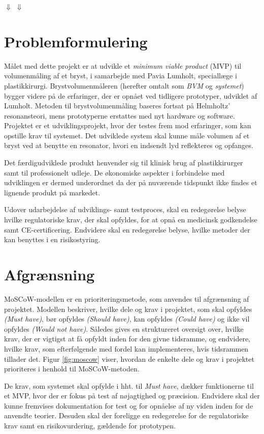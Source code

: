 \Wudl
$\Downarrow$
\Wudled
$\Downarrow$
\W
\vspace{5mm}  

\section{Problemformulering}
Målet med dette projekt er at udvikle et \textit{minimum viable product} (MVP) til volumenmåling af et bryst, i samarbejde med Pavia Lumholt, speciallæge i plastikkirurgi. Brystvolumenmåleren (herefter omtalt som \textit{BVM} og \textit{systemet}) bygger videre på de erfaringer, der er opnået ved tidligere prototyper, udviklet af Lumholt. Metoden til brystvolumenmåling baseres fortsat på Helmholtz' resonansteori, mens prototyperne erstattes med nyt hardware og software. Projektet er et udviklingsprojekt, hvor der testes frem mod erfaringer, som kan opstille krav til systemet. Det udviklede system skal kunne måle volumen af et bryst ved at benytte en resonator, hvori en indsendt lyd reflekteres og opfanges. 

Det færdigudviklede produkt henvender sig til klinisk brug af plastikkirurger samt til professionelt udleje. De økonomiske aspekter i forbindelse med udviklingen er dermed underordnet da der på nuværende tidspunkt ikke findes et lignende produkt på markedet.   

Udover udarbejdelse af udviklings- samt testproces, skal en redegørelse belyse hvilke regulatoriske krav, der skal opfyldes, for at opnå en medicinsk godkendelse samt CE-certificering. Endvidere skal en redegørelse belyse, hvilke metoder der kan benyttes i en risikostyring.

\section{Afgrænsning}
MoSCoW-modellen er en prioriteringsmetode, som anvendes til afgrænsning af projektet. Modellen beskriver, hvilke dele og krav i projektet, som skal opfyldes \textit{(Must have)}, bør opfyldes \textit{(Should have)}, kan opfyldes \textit{(Could have)} og ikke vil opfyldes \textit{(Would not have)}. Således gives en struktureret oversigt over, hvilke krav, der er vigtigst at få opfyldt inden for den givne tidsramme, og endvidere, hvilke krav, som efterfølgende med fordel kan implementeres, hvis tidsrammen tillader det. Figur \ref{fig:moscow} viser, hvordan de enkelte dele og krav i projektet prioriteres i henhold til MoSCoW-metoden.

De krav, som systemet skal opfylde i hht. til \textit{Must have}, dækker funktionerne til et MVP, hvor der er fokus på test af nøjagtighed og præcision. Endvidere skal der kunne fremvises dokumentation for test og for opnåelse af ny viden inden for de anvendte teorier. Desuden skal der foreligge en redegørelse for de regulatoriske krav samt en risikovurdering, gældende for prototypen.

